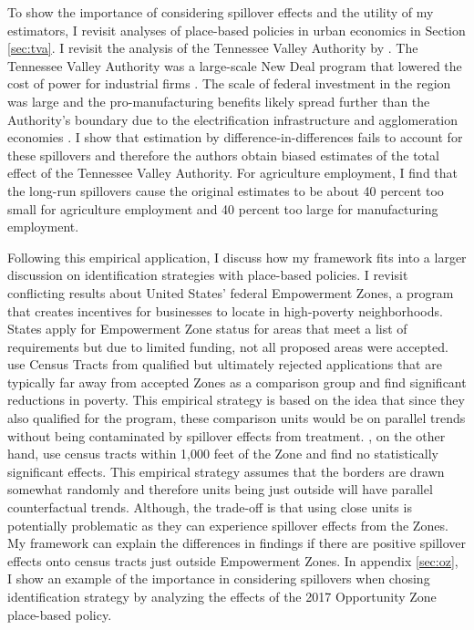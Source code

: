 \documentclass[11pt]{article}
\begin{document}
To show the importance of considering spillover effects and the utility of my estimators, I revisit analyses of place-based policies in urban economics in Section \ref{sec:tva}. I revisit the analysis of the Tennessee Valley Authority by \citet{Kline_Moretti_2014}. The Tennessee Valley Authority was a large-scale New Deal program that lowered the cost of power for industrial firms \citep{Kitchens_2014}. The scale of federal investment in the region was large and the pro-manufacturing benefits likely spread further than the Authority's boundary due to the electrification infrastructure and agglomeration economies \citep{Severnini_2014}. I show that estimation by difference-in-differences fails to account for these spillovers and therefore the authors obtain biased estimates of the total effect of the Tennessee Valley Authority. For agriculture employment, I find that the long-run spillovers cause the original estimates to be about 40 percent too small for agriculture employment and 40 percent too large for manufacturing employment.

Following this empirical application, I discuss how my framework fits into a larger discussion on identification strategies with place-based policies. I revisit conflicting results about United States' federal Empowerment Zones, a program that creates incentives for businesses to locate in high-poverty neighborhoods. States apply for Empowerment Zone status for areas that meet a list of requirements but due to limited funding, not all proposed areas were accepted. \citet{Busso_Gregory_Kline_2013} use Census Tracts from qualified but ultimately rejected applications that are typically far away from accepted Zones as a comparison group and find significant reductions in poverty. This empirical strategy is based on the idea that since they also qualified for the program, these comparison units would be on parallel trends without being contaminated by spillover effects from treatment. \citet{Neumark_Kolko_2010}, on the other hand, use census tracts within 1,000 feet of the Zone and find no statistically significant effects. This empirical strategy assumes that the borders are drawn somewhat randomly and therefore units being just outside will have parallel counterfactual trends. Although, the trade-off is that using close units is potentially problematic as they can experience spillover effects from the Zones. My framework can explain the differences in findings if there are positive spillover effects onto census tracts just outside Empowerment Zones. In appendix \ref{sec:oz}, I show an example of the importance in considering spillovers when chosing identification strategy by analyzing the effects of the 2017 Opportunity Zone place-based policy.
\end{document}
